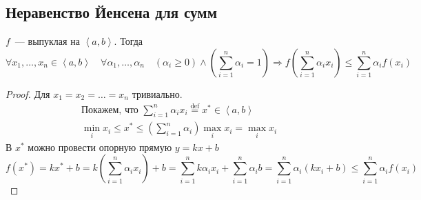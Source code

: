 \documentclass[../main.tex]{subfiles}
\begin{document}
\subsection{Неравенство Йенсена для сумм}
$f$~--- выпуклая на $\left<a,b\right>$. Тогда
\begin{equation*}
    \forall x_1,\dots,x_n \in \left<a,b\right> \quad
    \forall \alpha_1,\dots,\alpha_n \quad
    \left(\alpha_i\ge0\right)\land\left(\sum_{i=1}^{n}\alpha_i=1\right) \Rightarrow
    f\left(\sum_{i=1}^{n}\alpha_i x_i\right)\le\sum_{i=1}^{n}\alpha_i f(x_i)
\end{equation*}
\begin{proof}
    Для $x_1=x_2=\dots=x_n$ тривиально.
\begin{gather*}
    \text{Покажем, что }\sum\limits_{i=1}^{n}\alpha_i x_i\overset{\text{def}}{=}x^*\in\left<a,b\right>\\
    \min_i x_i \le x^* \le \left(\sum_{i=1}^{n}\alpha_i\right)\max_i x_i = \max_i x_i 
\end{gather*}
В $x^*$ можно провести опорную прямую $y=kx+b$
\begin{equation*}
    f(x^*)=kx^*+b=
    k\left(\sum_{i=1}^{n}\alpha_i x_i\right)+b=
    \sum_{i=1}^{n}k\alpha_i x_i+\sum_{i=1}^{n}\alpha_i b=
    \sum_{i=1}^{n}\alpha_i (k x_i+b)\le
    \sum_{i=1}^{n}\alpha_i f(x_i)
\end{equation*}
\end{proof}
\newpage


\end{document}
